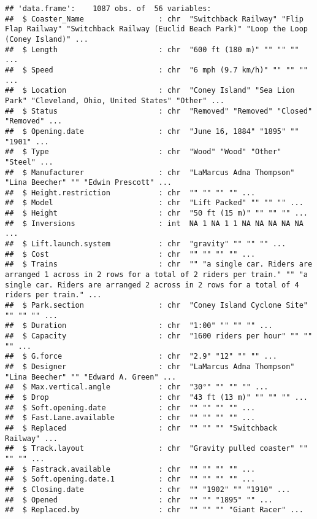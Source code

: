 \documentclass[
]{article}
\begin{document}
\begin{verbatim}
## 'data.frame':    1087 obs. of  56 variables:
##  $ Coaster_Name                 : chr  "Switchback Railway" "Flip Flap Railway" "Switchback Railway (Euclid Beach Park)" "Loop the Loop (Coney Island)" ...
##  $ Length                       : chr  "600 ft (180 m)" "" "" "" ...
##  $ Speed                        : chr  "6 mph (9.7 km/h)" "" "" "" ...
##  $ Location                     : chr  "Coney Island" "Sea Lion Park" "Cleveland, Ohio, United States" "Other" ...
##  $ Status                       : chr  "Removed" "Removed" "Closed" "Removed" ...
##  $ Opening.date                 : chr  "June 16, 1884" "1895" "" "1901" ...
##  $ Type                         : chr  "Wood" "Wood" "Other" "Steel" ...
##  $ Manufacturer                 : chr  "LaMarcus Adna Thompson" "Lina Beecher" "" "Edwin Prescott" ...
##  $ Height.restriction           : chr  "" "" "" "" ...
##  $ Model                        : chr  "Lift Packed" "" "" "" ...
##  $ Height                       : chr  "50 ft (15 m)" "" "" "" ...
##  $ Inversions                   : int  NA 1 NA 1 1 NA NA NA NA NA ...
##  $ Lift.launch.system           : chr  "gravity" "" "" "" ...
##  $ Cost                         : chr  "" "" "" "" ...
##  $ Trains                       : chr  "" "a single car. Riders are arranged 1 across in 2 rows for a total of 2 riders per train." "" "a single car. Riders are arranged 2 across in 2 rows for a total of 4 riders per train." ...
##  $ Park.section                 : chr  "Coney Island Cyclone Site" "" "" "" ...
##  $ Duration                     : chr  "1:00" "" "" "" ...
##  $ Capacity                     : chr  "1600 riders per hour" "" "" "" ...
##  $ G.force                      : chr  "2.9" "12" "" "" ...
##  $ Designer                     : chr  "LaMarcus Adna Thompson" "Lina Beecher" "" "Edward A. Green" ...
##  $ Max.vertical.angle           : chr  "30°" "" "" "" ...
##  $ Drop                         : chr  "43 ft (13 m)" "" "" "" ...
##  $ Soft.opening.date            : chr  "" "" "" "" ...
##  $ Fast.Lane.available          : chr  "" "" "" "" ...
##  $ Replaced                     : chr  "" "" "" "Switchback Railway" ...
##  $ Track.layout                 : chr  "Gravity pulled coaster" "" "" "" ...
##  $ Fastrack.available           : chr  "" "" "" "" ...
##  $ Soft.opening.date.1          : chr  "" "" "" "" ...
##  $ Closing.date                 : chr  "" "1902" "" "1910" ...
##  $ Opened                       : chr  "" "" "1895" "" ...
##  $ Replaced.by                  : chr  "" "" "" "Giant Racer" ...

\end{verbatim}
\end{document}
